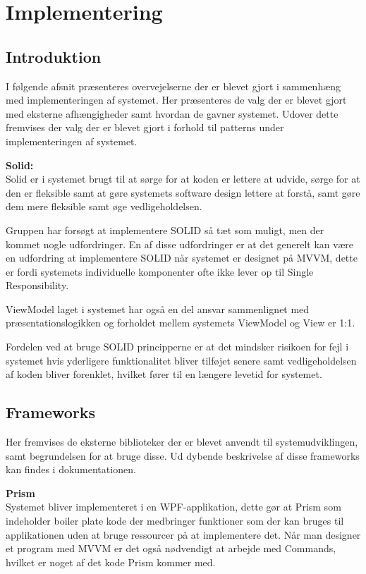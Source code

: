 \documentclass[Rapport/Rapport_main.tex]{subfiles}
\begin{document}
\section{Implementering}

\subsection{Introduktion}
I følgende afsnit præsenteres overvejelserne der er blevet gjort i sammenhæng med implementeringen af systemet.
Her præsenteres de valg der er blevet gjort med eksterne afhængigheder samt hvordan de gavner systemet. 
Udover dette fremvises der valg der er blevet gjort i forhold til patterns under implementeringen af systemet. 

\textbf{Solid:}\\
Solid er i systemet brugt til at sørge for at koden er lettere at udvide, sørge for at den er fleksible samt at gøre systemets software design lettere at forstå, samt gøre dem mere fleksible samt øge vedligeholdelsen.

Gruppen har forsøgt at implementere SOLID så tæt som muligt, men der kommet nogle udfordringer. En af disse udfordringer er at det generelt kan være en udfordring at implementere SOLID når systemet er designet på MVVM, dette er fordi systemets individuelle komponenter ofte ikke lever op til Single Responsibility. 

ViewModel laget i systemet har også en del ansvar sammenlignet med præsentationslogikken og forholdet mellem systemets ViewModel og View er 1:1. 

Fordelen ved at bruge SOLID principperne er at det mindsker risikoen for fejl i systemet hvis yderligere funktionalitet bliver tilføjet senere samt vedligeholdelsen af koden bliver forenklet, hvilket fører til en længere levetid for systemet.


\subsection{Frameworks}
Her fremvises de eksterne biblioteker der er blevet anvendt til systemudviklingen, samt begrundelsen for at bruge disse. Ud dybende beskrivelse af disse frameworks kan findes i dokumentationen.

\textbf{Prism}\\
Systemet bliver implementeret i en WPF-applikation, dette gør at Prism som indeholder boiler plate kode der medbringer funktioner som der kan bruges til applikationen uden at bruge ressourcer på at implementere det. Når man designer et program med MVVM er det også nødvendigt at arbejde med Commands, hvilket er noget af det kode Prism kommer med.  
\end{document}
